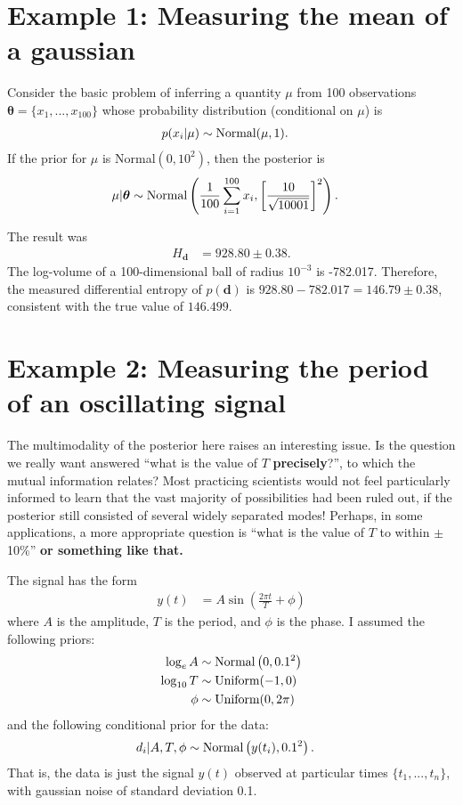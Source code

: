 \documentclass[entropy,article,submit,oneauthor,pdftex,10pt,a4paper]{mdpi}
\renewcommand{\d}{\boldsymbol{d}}
\newcommand{\todo}{\color{orange} \bf}
\newcommand{\x}{\boldsymbol{\theta}}
\begin{document}
\section{Example 1: Measuring the mean of a gaussian}

Consider the basic problem of inferring a quantity $\mu$ from
100 observations $\x = \{x_1, ..., x_{100}\}$ whose probability distribution
(conditional on $\mu$) is
\begin{align}
p(x_i | \mu) &\sim \textnormal{Normal}(\mu, 1).
\end{align}
If the prior for $\mu$ is Normal$(0, 10^2)$, then the posterior is
\begin{align}
\mu | \x &\sim \textnormal{Normal}\left(
                                       \frac{1}{100}\sum_{i=1}^{100} x_i,
                                       \left[\frac{10}{\sqrt{10001}}\right]^2
                                       \right).
\end{align}

The result was
\begin{align}
H_{\d} &= 928.80 \pm 0.38.
\end{align}
The log-volume of a 100-dimensional ball of radius $10^{-3}$ is
-782.017. Therefore, the measured differential entropy of
$p(\d)$ is $928.80 - 782.017 = 146.79 \pm 0.38$, consistent with the
true value of $146.499$.


\section{Example 2: Measuring the period of an oscillating signal}


The multimodality of the posterior here raises an interesting issue. Is
the question we really want answered ``what is the value of $T$
{\bf precisely}?'', to which the mutual information relates?
Most practicing scientists would not feel particularly informed to learn
that the vast majority of possibilities had been ruled out, if the
posterior still consisted of several widely separated modes!
Perhaps, in some applications, a more appropriate question is
``what is the value of $T$ to within $\pm$ 10\%''
{\todo or something like that.}

The signal has the form
\begin{align}
y(t) &= A \sin \left(\frac{2\pi t}{T} + \phi\right)
\end{align}
where $A$ is the amplitude, $T$ is the period, and $\phi$ is the phase.
I assumed the following priors:
\begin{align}
\log_e{A}   &\sim \textnormal{Normal}\left(0, 0.1^2\right)  \\
\log_{10} T &\sim \textnormal{Uniform}(-1, 0)  \\
\phi        &\sim \textnormal{Uniform}(0, 2\pi)
\end{align}
and the following conditional prior for the data:
\begin{align}
d_i | A, T, \phi &\sim \textnormal{Normal}\left(y(t_i), 0.1^2\right).
\end{align}
That is, the data is just the signal $y(t)$ observed at particular times
$\{t_1, ..., t_n\}$, with gaussian noise of standard deviation 0.1.
\end{document}
